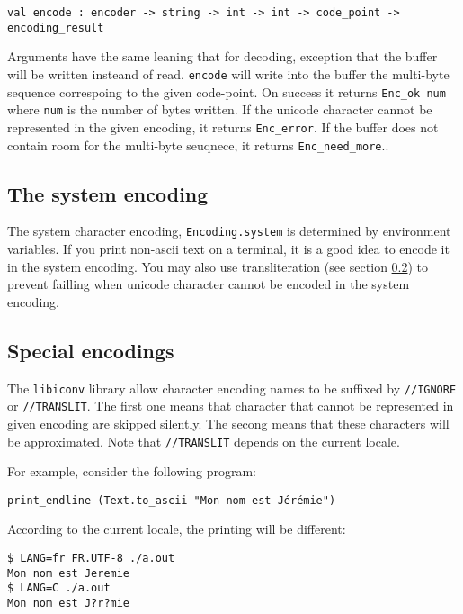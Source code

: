 \documentclass{article}
\begin{document}
\begin{verbatim}
val encode : encoder -> string -> int -> int -> code_point -> encoding_result
\end{verbatim}

Arguments have the same leaning that for decoding, exception that the
buffer will be written insteand of read. \texttt{encode} will write
into the buffer the multi-byte sequence correspoing to the given
code-point. On success it returns \texttt{Enc\_ok num} where
\texttt{num} is the number of bytes written. If the unicode character
cannot be represented in the given encoding, it returns
\texttt{Enc\_error}. If the buffer does not contain room for the
multi-byte seuqnece, it returns \texttt{Enc\_need\_more}..

\subsection{The system encoding}

The system character encoding, \texttt{Encoding.system} is determined
by environment variables. If you print non-ascii text on a terminal,
it is a good idea to encode it in the system encoding. You may also
use transliteration (see section \ref{special-encoding}) to prevent
failling when unicode character cannot be encoded in the system
encoding.

\subsection{Special encodings}
\label{special-encoding}

The \texttt{libiconv} library allow character encoding names to be
suffixed by \texttt{//IGNORE} or \texttt{//TRANSLIT}. The first one
means that character that cannot be represented in given encoding are
skipped silently. The secong means that these characters will be
approximated. Note that \texttt{//TRANSLIT} depends on the current
locale.

For example, consider the following program:

\begin{verbatim}
print_endline (Text.to_ascii "Mon nom est Jérémie")
\end{verbatim}

According to the current locale, the printing will be different:

\begin{verbatim}
$ LANG=fr_FR.UTF-8 ./a.out
Mon nom est Jeremie
$ LANG=C ./a.out
Mon nom est J?r?mie
\end{verbatim}
\end{document}
